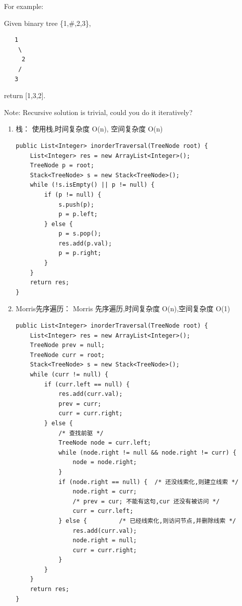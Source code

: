 \documentclass[12pt]{book}
\begin{document}
For example:

Given binary tree \{1,\#,2,3\},
\lstset{language=java,label= ,caption= ,numbers=none}
\begin{lstlisting}
   1
    \
     2
    /
   3
\end{lstlisting}

return [1,3,2].

Note: Recursive solution is trivial, could you do it iteratively?
\begin{enumerate}
\item 栈： 使用栈,时间复杂度 O(n), 空间复杂度 O(n)
\label{sec-4-2-2-1}

\lstset{language=java,label= ,caption= ,numbers=none}
\begin{lstlisting}
public List<Integer> inorderTraversal(TreeNode root) {
    List<Integer> res = new ArrayList<Integer>();
    TreeNode p = root;
    Stack<TreeNode> s = new Stack<TreeNode>();
    while (!s.isEmpty() || p != null) {
        if (p != null) {
            s.push(p);
            p = p.left;
        } else {
            p = s.pop();
            res.add(p.val);
            p = p.right;
        }
    }
    return res;
}
\end{lstlisting}

\item Morris先序遍历： Morris 先序遍历,时间复杂度 O(n),空间复杂度 O(1)
\label{sec-4-2-2-2}

\lstset{language=java,label= ,caption= ,numbers=none}
\begin{lstlisting}
public List<Integer> inorderTraversal(TreeNode root) {
    List<Integer> res = new ArrayList<Integer>();
    TreeNode prev = null;
    TreeNode curr = root;
    Stack<TreeNode> s = new Stack<TreeNode>();
    while (curr != null) {
        if (curr.left == null) {
            res.add(curr.val);
            prev = curr;
            curr = curr.right;
        } else {
            /* 查找前驱 */
            TreeNode node = curr.left;
            while (node.right != null && node.right != curr) {
                node = node.right;
            }
            if (node.right == null) {  /* 还没线索化,则建立线索 */
                node.right = curr;
                /* prev = cur; 不能有这句,cur 还没有被访问 */
                curr = curr.left;
            } else {         /* 已经线索化,则访问节点,并删除线索 */
                res.add(curr.val);
                node.right = null;
                curr = curr.right;
            }
        }
    }
    return res;
}
\end{lstlisting}
\end{enumerate}
\end{document}
